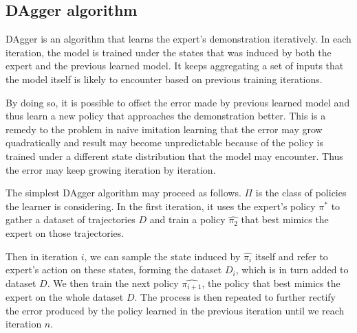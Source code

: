 \documentclass[twoside]{article}
\begin{document}






\subsection{DAgger algorithm}
DAgger is an algorithm that learns the expert's demonstration iteratively. In each iteration, the model is trained under the states that was induced by both the expert and the previous learned model. It keeps aggregating a set of inputs that the model itself is likely to encounter based on previous training iterations.  

By doing so, it is possible to offset the error made by previous learned model and thus learn a new policy that approaches the demonstration better. This is a remedy to the problem in naive imitation learning that the error may grow quadratically and result may become unpredictable because of the policy is trained under a different state distribution that the model may encounter. Thus the error may keep growing iteration by iteration.

The simplest DAgger algorithm may proceed as follows.
$\Pi$ is the class of policies the learner is considering.
In the first iteration, it uses the expert’s policy $\pi^*$ to gather
a dataset of trajectories $D$ and train a policy $\hat{\pi_2}$ that best mimics the expert on those trajectories. 

Then in iteration $i$, we can sample the state induced by $\hat{\pi_i}$ itself and refer to expert's action on these states, forming the dataset $D_i$, which is in turn added to dataset $D$. We then train the next policy $\hat{\pi_{i+1}}$, the policy that best mimics the expert on the whole dataset $D$. The process is then repeated to further rectify the error produced by the policy learned in the previous iteration until we reach iteration $n$.
\end{document}
